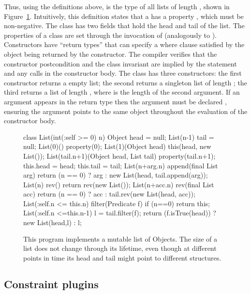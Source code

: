 Thus, using the definitions above,  is the type of
all lists of length , shown in
Figure~\ref{fig:list-example}.
%
Intuitively, this definition states that a  has a 
property , which must be non-negative.  The class has two
fields that hold the head and tail of the list.  The properties of a
class are set through the invocation of 
(analogously to ).  Constructors have ``return
types'' that can specify a where clause satisfied by the object being
returned by the constructor.  The compiler verifies that the
constructor postcondition and the class invariant are implied by the
 statement and any  calls in the constructor
body.
%
The  class has three constructors: the first
constructor returns a empty list; the second returns 
a singleton list of length ; the third
returns a list of length , where  is
the length of the second argument.  If an argument appears in the
return type then the argument must be declared ,
ensuring the
argument points to the same object throughout the evaluation of
the constructor body.


\begin{figure}
\begin{xten}
class List(int(:self >= 0) n) {
  Object head = null;
  List(n-1) tail = null;
  List(0)() { property(0); }
  List(1)(Object head) { this(head, new List());}
  List(tail.n+1)(Object head, List tail) {
    property(tail.n+1);
    this.head = head;
    this.tail = tail;
  }
  List(n+arg.n) append(final List arg) {
    return (n == 0) 
      ? arg : new List(head, tail.append(arg));
  }
  List(n) rev() { return rev(new List()); }
  List(n+acc.n) rev(final List acc) {
    return (n == 0) 
     ? acc : tail.rev(new List(head, acc));
  }
  List(:self.n <= this.n) filter(Predicate f) {
    if (n==0) return this;
    List(:self.n <=this.n-1) l = tail.filter(f);
    return (f.isTrue(head)) ?
     new List(head,l) : l;
  }
}
\end{xten}

\caption{
This program implements a mutable list of Objects. The size of a list
does not change through its lifetime, even though at different points
in time its head and tail might point to different structures.}
\label{fig:list-example}
\end{figure}

\subsection{Constraint plugins}


